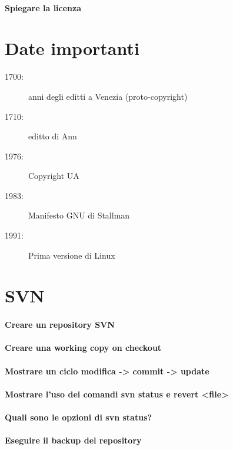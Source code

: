 \documentclass[a4paper]{article}
\begin{document}
			\paragraph{Spiegare la licenza}
		
		
	\section{Date importanti}
	
	\begin{description}
		\item[1700:] anni degli editti a Venezia (proto-copyright)
		\item[1710:] editto di Ann
		\item[1976:] Copyright UA
		\item[1983:] Manifesto GNU di Stallman
		\item[1991:] Prima versione di Linux
	\end{description}
	
	
	\section{SVN}
	
	\paragraph{Creare un repository SVN}
	
	\paragraph{Creare una working copy on checkout}
	
	\paragraph{Mostrare un ciclo modifica -> commit -> update}
	
	\paragraph{Mostrare l'uso dei comandi svn status e revert <file>}
	
	\paragraph{Quali sono le opzioni di svn status?}
	
	\paragraph{Eseguire il backup del repository}
	
\end{document}
